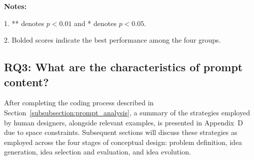 \documentclass{dsj}
\begin{document}
\begin{table}[htp]
\centering
\caption{Expert rating results combined two tasks.}
\label{tab:expert_rating_results}
\begin{tablenotes}
    \footnotesize
    \item[] \textbf{Notes:}
    \item 1. ** denotes \(p < 0.01\) and * denotes \(p < 0.05\).
    \item 2. Bolded scores indicate the best performance among the four groups.
\end{tablenotes}
\end{table}


\subsection{RQ3: What are the characteristics of prompt content?}
\label{subsec_RQ3_result}
After completing the coding process described in Section~\ref{subsubsection:prompt_analysis}, a summary of the strategies employed by human designers, alongside relevant examples, is presented in Appendix~D due to space constraints. Subsequent sections will discuss these strategies as employed across the four stages of conceptual design: problem definition, idea generation, idea selection and evaluation, and idea evolution.
\end{document}
